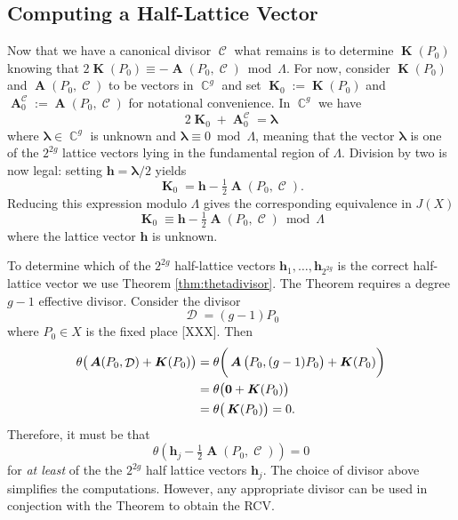 \documentclass[12pt]{article}
\theoremstyle{definition}
\DeclareMathOperator{\CC}{\mathbb{C}}
\DeclareMathOperator{\DivC}{\mathcal{C}}
\DeclareMathOperator{\DivD}{\mathcal{D}}
\DeclareMathOperator{\RCV}{\boldsymbol{K}}
\DeclareMathOperator{\Abel}{\boldsymbol{A}}
\begin{document}
\subsection{Computing a Half-Lattice Vector}


Now that we have a canonical divisor $\DivC$ what remains is to
determine $\RCV(P_0)$ knowing that $2\RCV(P_0) \equiv - \Abel(P_0,\DivC)
\bmod{\Lambda}$. For now, consider $\RCV(P_0)$ and $\Abel(P_0,\DivC)$ to
be vectors in $\CC^g$ and set $\RCV_0 := \RCV(P_0)$ and $\Abel_0^{\DivC}
:= \Abel(P_0,\DivC)$ for notational convenience. In $\CC^g$ we have
\begin{equation}
2\RCV_0 + \Abel_0^{\DivC} = \boldsymbol{\lambda}
\end{equation}
where $\boldsymbol{\lambda} \in \CC^g$ is unknown and
$\boldsymbol{\lambda} \equiv 0 \bmod{\Lambda}$, meaning that the vector
$\boldsymbol{\lambda}$ is one of the $2^{2g}$ lattice vectors lying in
the fundamental region of $\Lambda$. Division by two is now legal:
setting $\boldsymbol{h} = \boldsymbol{\lambda}/2$ yields
\begin{equation}
\RCV_0 = \boldsymbol{h} - \tfrac{1}{2} \Abel(P_0,\DivC).
\end{equation}
Reducing this expression modulo $\Lambda$ gives the corresponding
equivalence in $J(X)$
\begin{equation}
\RCV_0 \equiv \boldsymbol{h} - \tfrac{1}{2} \Abel(P_0,\DivC)
\bmod{\Lambda}
\end{equation}
where the lattice vector $\boldsymbol{h}$ is unknown.

To determine which of the $2^{2g}$ half-lattice vectors
$\boldsymbol{h}_1, \ldots, \boldsymbol{h}_{2^{2g}}$ is the correct
half-lattice vector we use Theorem \ref{thm:thetadivisor}. The Theorem
requires a degree $g-1$ effective divisor. Consider the divisor
\begin{equation} \label{eqn:simple-effective-divisor}
  \DivD = (g-1)P_0
\end{equation}
where $P_0 \in X$ is the fixed place [XXX]. Then
\begin{align*}
  \theta\big(\Abel(P_0,\DivD) + \RCV(P_0)\big)
  &=
  \theta\bigg(\Abel\big(P_0,(g-1)P_0\big) + \RCV(P_0)\bigg) \notag \\
  &=
  \theta\big(\boldsymbol{0} + \RCV(P_0)\big) \notag \\
  &=
  \theta\big(\RCV(P_0)\big) = 0.
\end{align*}
Therefore, it must be that
\begin{equation}
  \theta\left(
  \boldsymbol{h}_j - \tfrac{1}{2} \Abel(P_0,\DivC)
  \right) = 0
\end{equation}
for {\it at least} of the the $2^{2g}$ half lattice vectors
$\boldsymbol{h}_j$. The choice of divisor above simplifies the
computations. However, any appropriate divisor can be used in conjection
with the Theorem to obtain the RCV.
\end{document}
